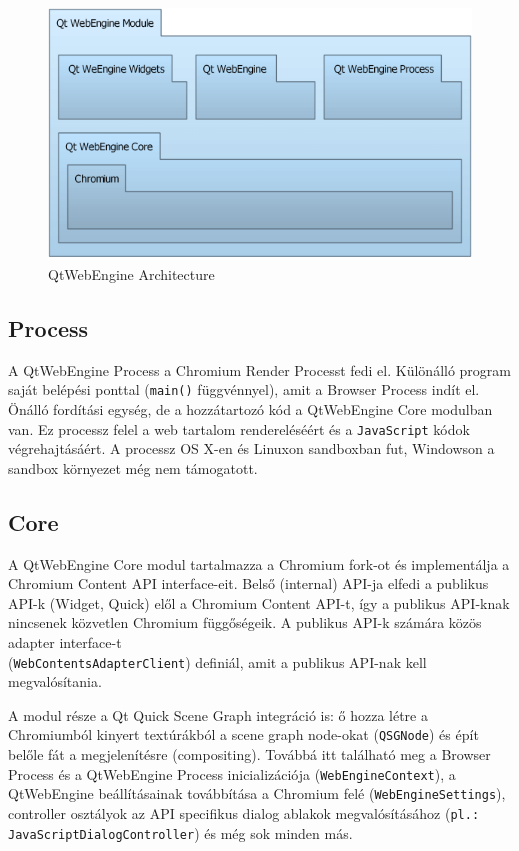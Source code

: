 \documentclass[12pt]{report}
\begin{document}
\begin{figure}[ht]
    \centering
    \includegraphics[scale=0.75]{qtwebengine-architecture}
    \caption{
        \label{fig:qtwebengine-architecture}
        QtWebEngine Architecture \cite{bib:qt-doc-webengine-overview}
    }
\end{figure}

\subsection{Process}
A QtWebEngine Process a Chromium Render Processt fedi el. Különálló program saját belépési
ponttal (\texttt{main()} függvénnyel), amit a Browser Process indít el. Önálló fordítási
egység, de a hozzátartozó kód a QtWebEngine Core modulban van.
Ez processz felel a web tartalom rendereléséért és a \texttt{JavaScript} kódok
végrehajtásáért. A processz OS X-en és Linuxon sandboxban fut, Windowson a sandbox
környezet még nem támogatott.

\subsection{Core}
A QtWebEngine Core modul tartalmazza a Chromium fork-ot és implementálja a \\
Chromium Content API interface-eit. Belső (internal) API-ja elfedi a publikus API-k
(Widget, Quick) elől a Chromium Content API-t, így a publikus API-knak nincsenek közvetlen
Chromium függőségeik. A publikus API-k számára közös adapter interface-t \\
(\texttt{WebContentsAdapterClient}) definiál, amit a publikus API-nak kell megvalósítania.

A modul része a Qt Quick Scene Graph integráció is: ő hozza létre a Chromiumból
kinyert textúrákból a scene graph node-okat (\texttt{QSGNode}) és épít belőle fát a
megjelenítésre (compositing). Továbbá itt található meg a Browser Process és a QtWebEngine
Process inicializációja (\texttt{WebEngineContext}), a QtWebEngine beállításainak továbbítása
a Chromium felé (\texttt{WebEngineSettings}), controller osztályok az API specifikus
dialog ablakok megvalósításához (\texttt{pl.: JavaScriptDialogController}) és még sok minden
más.
\end{document}

